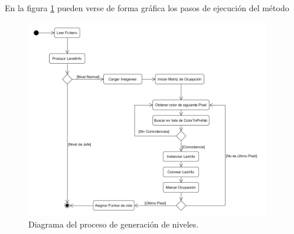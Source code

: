 En la figura \ref{generator_diagram} pueden verse de forma gráfica los pasos de ejecución del método
\begin{figure}[h]
	\includegraphics[width=0.95\textwidth]{images/estructura/niveles/level-generator}
	\centering
	\caption{Diagrama del proceso de generación de niveles.}
	\label{generator_diagram}
\end{figure}

